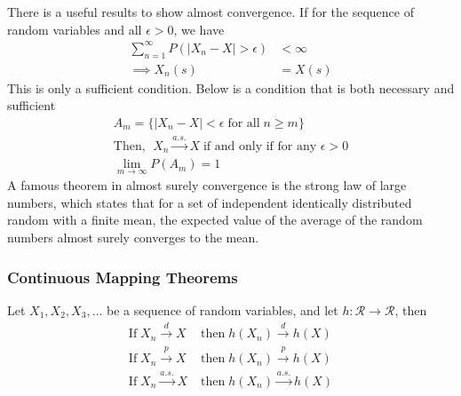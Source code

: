 \documentclass[../probability-notes.tex]{subfiles}
\begin{document}
    There is a useful results to show almost convergence. If for the sequence of random variables and all $\epsilon > 0$, we have
    \begin{align*}
        \sum_{n=1}^{\infty}P(\lvert X_{n} - X \rvert > \epsilon) &< \infty\\
        \implies X_{n}(s) &= X(s)
    \end{align*}
    This is only a sufficient condition. Below is a condition that is both necessary and sufficient
    \begin{align*}
        A_{m} = \{\lvert X_{n} - X \rvert < \epsilon \;\text{for all}\; n \geq m \}\\
        \text{Then, }\; X_{n} \overset{a.s.}\rightarrow X \;\text{if and only if for any $\epsilon > 0$}\\
        \lim_{m \to \infty} P(A_{m}) = 1
    \end{align*}
    A famous theorem in almost surely convergence is the strong law of large numbers, which states that for a set of independent identically distributed random with a finite mean, the expected value of the average of the random numbers almost surely converges to the mean.

    \subsubsection{Continuous Mapping Theorems}
    Let $X_{1}, X_{2}, X_{3}, \ldots$ be a sequence of random variables, and let $h: \mathcal{R} \rightarrow \mathcal{R}$, then
    \begin{align*}
        \text{If}\; X_{n} \overset{d}\rightarrow X \; &\text{then} \; h(X_{n}) \overset{d}\rightarrow h(X)\\
        \text{If}\; X_{n} \overset{p}\rightarrow X \; &\text{then} \; h(X_{n}) \overset{p}\rightarrow h(X)\\
        \text{If}\; X_{n} \overset{a.s.}\rightarrow X \; &\text{then} \; h(X_{n}) \overset{a.s.}\rightarrow h(X)
    \end{align*}

\end{document}
